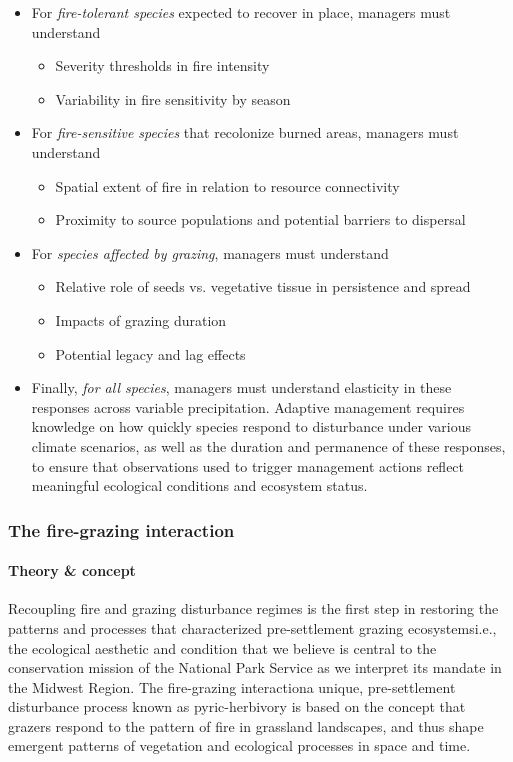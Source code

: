 \begin{itemize}
	\item For \emph{fire-tolerant species} expected to recover in place, managers must understand
		\begin{itemize}
			\item Severity thresholds in fire intensity
			\item Variability in fire sensitivity by season
		\end{itemize}
	\item For \emph{fire-sensitive species} that recolonize burned areas, managers must understand
		\begin{itemize}
			\item Spatial extent of fire in relation to resource connectivity
			\item Proximity to source populations and potential barriers to dispersal
		\end{itemize}
	\item For \emph{species affected by grazing}, managers must understand
		\begin{itemize}
			\item Relative role of seeds vs. vegetative tissue in persistence and spread
			\item Impacts of grazing duration
			\item Potential legacy and lag effects
		\end{itemize}
	\item Finally, \emph{for all species}, managers must understand elasticity in these responses across variable precipitation. 
	Adaptive management requires knowledge on how quickly species respond to disturbance under various climate scenarios, as well as the duration and permanence of these responses, to ensure that observations used to trigger management actions reflect meaningful ecological conditions and ecosystem status.
\end{itemize} 

\subsubsection{The fire-grazing interaction}

\paragraph{Theory \& concept} 

Recoupling fire and grazing disturbance regimes is the first step in restoring the patterns and processes that characterized pre-settlement grazing ecosystems\textemdash i.e., the ecological aesthetic and condition that we believe is central to the conservation mission of the National Park Service as we interpret its mandate in the Midwest Region. 
The fire-grazing interaction\textemdash a unique, pre-settlement disturbance process known as pyric-herbivory \citep{fuhlendorf2009}\textemdash is based on the concept that grazers respond to the pattern of fire in grassland landscapes, and thus shape emergent patterns of vegetation and ecological processes in space and time. 

